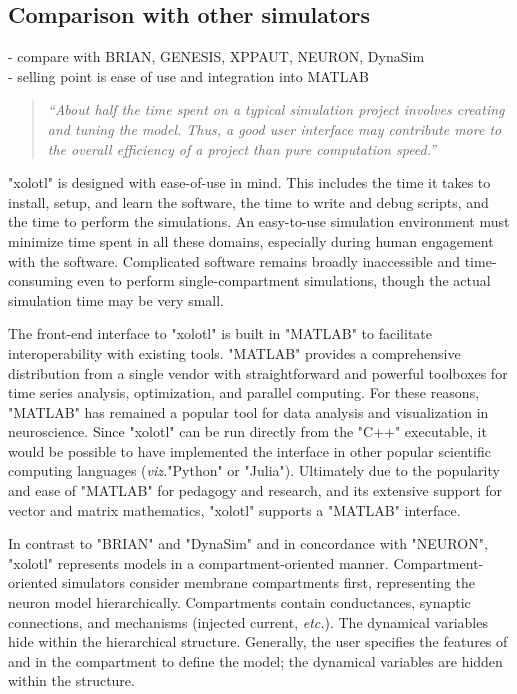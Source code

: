 \documentclass{frontiersSCNS} %
\newcommand{\etc}{\textit{etc.}\xspace}
\newcommand{\viz}{\textit{viz.}\xspace}
\begin{document}
\subsection{Comparison with other simulators}

- compare with BRIAN, GENESIS, XPPAUT, NEURON, DynaSim \\
- selling point is ease of use and integration into MATLAB

\begin{quote}
	\textit{``About half the time spent on a typical simulation project involves creating and tuning the model. Thus, a good user interface may contribute more to the overall efficiency of a project than pure computation speed.''}
	\begin{flushright}
		\cite{deschutterConsumerGuideNeuronal1992}
	\end{flushright}
\end{quote}

"xolotl" is designed with ease-of-use in mind. This includes the time it takes to install, setup, and learn the software, the time to write and debug scripts, and the time to perform the simulations. An easy-to-use simulation environment must minimize time spent in all these domains, especially during human engagement with the software. Complicated software remains broadly inaccessible and time-consuming even to perform single-compartment simulations, though the actual simulation time may be very small.

The front-end interface to "xolotl" is built in "MATLAB" to facilitate interoperability with existing tools. "MATLAB" provides a comprehensive distribution from a single vendor with straightforward and powerful toolboxes for time series analysis, optimization, and parallel computing. For these reasons, "MATLAB" has remained a popular tool for data analysis and visualization in neuroscience. Since "xolotl" can be run directly from the "C++" executable, it would be possible to have implemented the interface in other popular scientific computing languages (\viz "Python" or "Julia"). Ultimately due to the popularity and ease of "MATLAB" for pedagogy and research, and its extensive support for vector and matrix mathematics, "xolotl" supports a "MATLAB" interface.

In contrast to "BRIAN" and "DynaSim" and in concordance with "NEURON", "xolotl" represents models in a compartment-oriented manner. Compartment-oriented simulators consider membrane compartments first, representing the neuron model hierarchically. Compartments contain conductances, synaptic connections, and mechanisms (injected current, \etc). The dynamical variables hide within the hierarchical structure. Generally, the user specifies the features of and in the compartment to define the model; the dynamical variables are hidden within the structure.
\end{document}
